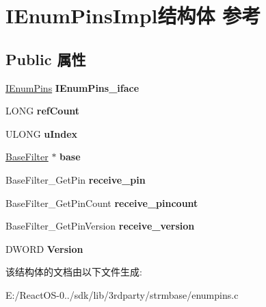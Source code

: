 \hypertarget{struct_i_enum_pins_impl}{}\section{I\+Enum\+Pins\+Impl结构体 参考}
\label{struct_i_enum_pins_impl}
\subsection*{Public 属性}
\begin{DoxyCompactItemize}
\item 
\mbox{\label{struct_i_enum_pins_impl_ad488661ce75cc8154e6484c8c16c3893}} 
\hyperlink{interface_i_enum_pins}{I\+Enum\+Pins} {\bfseries I\+Enum\+Pins\+\_\+iface}
\item 
\mbox{\label{struct_i_enum_pins_impl_a46e5d451bbe9ce432df2b0af41437c90}} 
L\+O\+NG {\bfseries ref\+Count}
\item 
\mbox{\label{struct_i_enum_pins_impl_aae8a7c0d6e25b9b83921a3350a7b268f}} 
U\+L\+O\+NG {\bfseries u\+Index}
\item 
\mbox{\label{struct_i_enum_pins_impl_a9541154460bb0bf9c3c5b69f07f3336a}} 
\hyperlink{struct_base_filter}{Base\+Filter} $\ast$ {\bfseries base}
\item 
\mbox{\label{struct_i_enum_pins_impl_a07000ba86ba2056bc74f169ec752b6df}} 
Base\+Filter\+\_\+\+Get\+Pin {\bfseries receive\+\_\+pin}
\item 
\mbox{\label{struct_i_enum_pins_impl_a48a1d245e7c8ca3fbf7170c6e410b384}} 
Base\+Filter\+\_\+\+Get\+Pin\+Count {\bfseries receive\+\_\+pincount}
\item 
\mbox{\label{struct_i_enum_pins_impl_a457b444b027b183d52fbc9b432d703e6}} 
Base\+Filter\+\_\+\+Get\+Pin\+Version {\bfseries receive\+\_\+version}
\item 
\mbox{\label{struct_i_enum_pins_impl_afff198320e98f136d169538ec89b7d7d}} 
D\+W\+O\+RD {\bfseries Version}
\end{DoxyCompactItemize}


该结构体的文档由以下文件生成\+:\begin{DoxyCompactItemize}
\item 
E\+:/\+React\+O\+S-\/0../sdk/lib/3rdparty/strmbase/enumpins.\+c\end{DoxyCompactItemize}
